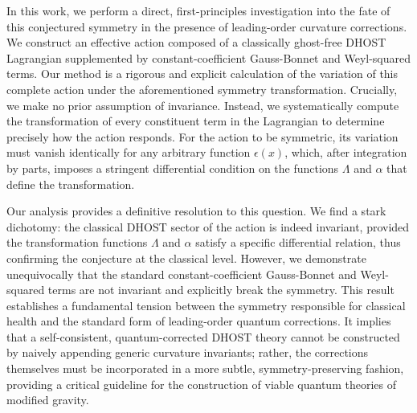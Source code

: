 \documentclass[twocolumn]{aastex631}
\begin{document}
In this work, we perform a direct, first-principles investigation into the fate of this conjectured symmetry in the presence of leading-order curvature corrections. We construct an effective action composed of a classically ghost-free DHOST Lagrangian supplemented by constant-coefficient Gauss-Bonnet and Weyl-squared terms. Our method is a rigorous and explicit calculation of the variation of this complete action under the aforementioned symmetry transformation. Crucially, we make no prior assumption of invariance. Instead, we systematically compute the transformation of every constituent term in the Lagrangian to determine precisely how the action responds. For the action to be symmetric, its variation must vanish identically for any arbitrary function $\epsilon(x)$, which, after integration by parts, imposes a stringent differential condition on the functions $\Lambda$ and $\alpha$ that define the transformation.

Our analysis provides a definitive resolution to this question. We find a stark dichotomy: the classical DHOST sector of the action is indeed invariant, provided the transformation functions $\Lambda$ and $\alpha$ satisfy a specific differential relation, thus confirming the conjecture at the classical level. However, we demonstrate unequivocally that the standard constant-coefficient Gauss-Bonnet and Weyl-squared terms are not invariant and explicitly break the symmetry. This result establishes a fundamental tension between the symmetry responsible for classical health and the standard form of leading-order quantum corrections. It implies that a self-consistent, quantum-corrected DHOST theory cannot be constructed by naively appending generic curvature invariants; rather, the corrections themselves must be incorporated in a more subtle, symmetry-preserving fashion, providing a critical guideline for the construction of viable quantum theories of modified gravity.
\end{document}
